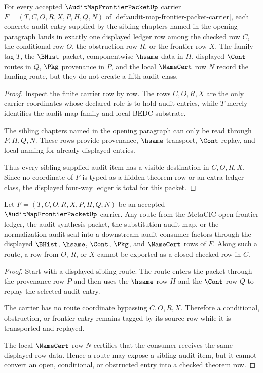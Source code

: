\begin{theorem}
\label{thm:audit-map-frontier-packet-ledger-totality}
For every accepted $\AuditMapFrontierPacketUp$ carrier $F=(T,C,O,R,X,P,H,Q,N)$ of \autoref{def:audit-map-frontier-packet-carrier}, each concrete audit entry supplied by the sibling chapters named in the opening paragraph lands in exactly one displayed ledger row among the checked row $C$, the conditional row $O$, the obstruction row $R$, or the frontier row $X$. The family tag $T$, the $\BHist$ packet, componentwise $\hsame$ data in $H$, displayed $\Cont$ routes in $Q$, $\Pkg$ provenance in $P$, and the local $\NameCert$ row $N$ record the landing route, but they do not create a fifth audit class.
\end{theorem}
\begin{proof}
Inspect the finite carrier row by row. The rows $C,O,R,X$ are the only carrier coordinates whose declared role is to hold audit entries, while $T$ merely identifies the audit-map family and local BEDC substrate.

The sibling chapters named in the opening paragraph can only be read through $P,H,Q,N$. These rows provide provenance, $\hsame$ transport, $\Cont$ replay, and local naming for already displayed entries.

Thus every sibling-supplied audit item has a visible destination in $C,O,R,X$. Since no coordinate of $F$ is typed as a hidden theorem row or an extra ledger class, the displayed four-way ledger is total for this packet.
\end{proof}

\begin{theorem}
\label{thm:audit-map-frontier-packet-route-nonescape}
Let $F=(T,C,O,R,X,P,H,Q,N)$ be an accepted $\AuditMapFrontierPacketUp$ carrier. Any route from the MetaCIC open-frontier ledger, the audit synthesis packet, the substitution audit map, or the normalization audit seal into a downstream audit consumer factors through the displayed $\BHist$, $\hsame$, $\Cont$, $\Pkg$, and $\NameCert$ rows of $F$. Along such a route, a row from $O$, $R$, or $X$ cannot be exported as a closed checked row in $C$.
\end{theorem}
\begin{proof}
Start with a displayed sibling route. The route enters the packet through the provenance row $P$ and then uses the $\hsame$ row $H$ and the $\Cont$ row $Q$ to replay the selected audit entry.

The carrier has no route coordinate bypassing $C,O,R,X$. Therefore a conditional, obstruction, or frontier entry remains tagged by its source row while it is transported and replayed.

The local $\NameCert$ row $N$ certifies that the consumer receives the same displayed row data. Hence a route may expose a sibling audit item, but it cannot convert an open, conditional, or obstructed entry into a checked theorem row.
\end{proof}

